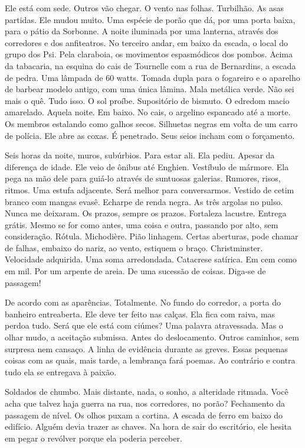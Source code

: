 Ele está com sede. Outros vão chegar. O vento nas folhas. Turbilhão. As
asas partidas. Ele mudou muito. Uma espécie de porão que dá, por uma
porta baixa, para o pátio da Sorbonne. A noite iluminada por uma
lanterna, através dos corredores e dos anfiteatros. No terceiro andar,
em baixo da escada, o local do grupo dos Psi. Pela claraboia, os
movimentos espasmódicos dos pombos. Acima da tabacaria, na esquina do
cais de Tournelle com a rua de Bernardins, a escada de pedra. Uma
lâmpada de 60 watts. Tomada dupla para o fogareiro e o aparelho de
barbear modelo antigo, com uma única lâmina. Mala metálica verde. Não
sei mais o quê. Tudo isso. O sol proíbe. Supositório de bismuto. O
edredom macio amarelado. Aquela noite. Em baixo. No cais, o argelino
espancado até a morte. Os membros estalando como galhos secos. Silhuetas
negras em volta de um carro de polícia. Ele abre as coxas. É penetrado.
Seus seios incham com o forçamento.

Seis horas da noite, muros, subúrbios. Para estar ali. Ela pediu. Apesar
da diferença de idade. Ele veio de ônibus até Enghien. Vestíbulo de
mármore. Ela pega na mão dele para guiá-lo através de suntuosas
galerias. Rumores, risos, ritmos. Uma estufa adjacente. Será melhor para
conversarmos. Vestido de cetim branco com mangas evasê. Echarpe de renda
negra. As três argolas no pulso. Nunca me deixaram. Os prazos, sempre os
prazos. Fortaleza lacustre. Entrega grátis. Mesmo se for como antes, uma
coisa e outra, passando por alto, sem consideração. Rótula. Michodière.
Pião linhagem. Certas aberturas, pode chamar de falhas, embaixo do
nariz, ao vento, estiquem o braço. Christminster. Velocidade adquirida.
Uma soma arredondada. Catacrese satírica. Em cem como em mil. Por um
arpente de areia. De uma sucessão de coisas. Diga-se de passagem!

De acordo com as aparências. Totalmente. No fundo do corredor, a porta
do banheiro entreaberta. Ele deve ter feito nas calças. Ela fica com
raiva, mas perdoa tudo. Será que ele está com ciúmes? Uma palavra
atravessada. Mas o olhar mudo, a aceitação submissa. Antes do
deslocamento. Outros caminhos, sem surpresa nem cansaço. A linha de
evidência durante as greves. Essas pequenas coisas com as quais, mais
tarde, a lembrança fará poemas. Ao contrário e contra tudo ela se
entregava à paixão.

Soldados de chumbo. Mais distante, nada, o sonho, a alteridade ritmada.
Você acha que talvez haja guerra na rua, nos corredores, no porão?
Fechamento da passagem de nível. Os olhos puxam a cortina. A escada de
ferro em baixo do edifício. Alguém devia trazer as chaves. Na hora de
sair do escritório, ele hesita em pegar o revólver porque ela poderia
perceber.

